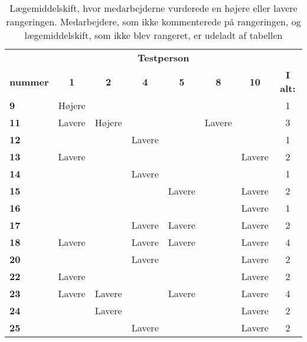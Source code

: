 \begin{longtable}{|l|c|c|c|c|c|c|c|}\caption{Lægemiddelskift, hvor medarbejderne vurderede en højere eller lavere rangeringen. Medarbejdere, som ikke kommenterede på rangeringen, og lægemiddelskift, som ikke blev rangeret, er udeladt af tabellen}
\label{table:resultat3} \\ \hline
\rowcolor[HTML]{C0C0C0}{\textbf{Lægemiddel}}& \multicolumn{6}{c}{\textbf{Testperson}} &  \\
\rowcolor[HTML]{C0C0C0}\textbf{nummer}& \textbf{1} & \textbf{2} & \textbf{4} & \textbf{5} & \textbf{8} & \textbf{10}  & \textbf{I alt:}\\ \hline
\cellcolor[HTML]{C0C0C0}\textbf{9} & Højere & & & & &  & \cellcolor[HTML]{EFEFEF} 1 \\ \hline
\cellcolor[HTML]{C0C0C0}\textbf{11} & Lavere & Højere & & & Lavere &  & \cellcolor[HTML]{EFEFEF}3 \\\hline
\cellcolor[HTML]{C0C0C0}\textbf{12} & & & Lavere & & & & \cellcolor[HTML]{EFEFEF}1 \\\hline
\cellcolor[HTML]{C0C0C0}\textbf{13}& Lavere  & & & & & Lavere  & \cellcolor[HTML]{EFEFEF}2  \\ \hline
\cellcolor[HTML]{C0C0C0}\textbf{14} &  & & Lavere  & & &  & \cellcolor[HTML]{EFEFEF}1 \\ \hline
\cellcolor[HTML]{C0C0C0}\textbf{15} & & & & Lavere & & Lavere  & \cellcolor[HTML]{EFEFEF}2 \\\hline
\cellcolor[HTML]{C0C0C0}\textbf{16} & & & &  & & Lavere & \cellcolor[HTML]{EFEFEF}1 \\\hline
\cellcolor[HTML]{C0C0C0}\textbf{17}& & & Lavere & Lavere & & Lavere & \cellcolor[HTML]{EFEFEF}2 \\\hline
\cellcolor[HTML]{C0C0C0}\textbf{18} & Lavere & & Lavere & Lavere & & Lavere & \cellcolor[HTML]{EFEFEF}4 \\\hline
\cellcolor[HTML]{C0C0C0}\textbf{20} & & & Lavere &  & & Lavere & \cellcolor[HTML]{EFEFEF}2 \\\hline
\cellcolor[HTML]{C0C0C0}\textbf{22} & Lavere & &  &  & & Lavere & \cellcolor[HTML]{EFEFEF} 2\\\hline
\cellcolor[HTML]{C0C0C0}\textbf{23} & Lavere & Lavere & & Lavere & & Lavere  & \cellcolor[HTML]{EFEFEF} 4\\ \hline
\cellcolor[HTML]{C0C0C0}\textbf{24} & & Lavere & & & & Lavere & \cellcolor[HTML]{EFEFEF} 2 \\\hline
\cellcolor[HTML]{C0C0C0}\textbf{25} & & & Lavere & & & Lavere & \cellcolor[HTML]{EFEFEF} 2 \\\hline

\end{longtable}
